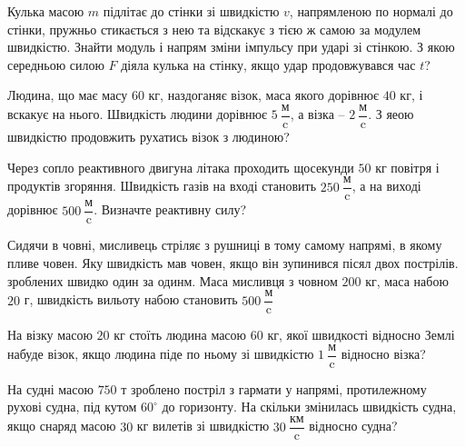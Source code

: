 \justifying

\begin{problem}{1}
	Кулька масою $m$ підлітає до стінки зі швидкістю $v$, напрямленою по нормалі до стінки, пружньо стикається з нею та відскакує з тією ж самою за модулем швидкістю. Знайти модуль і напрям зміни імпульсу при ударі зі стінкою. З якою середньою силою $F$ діяла кулька на стінку, якщо удар продовжувався час $t$?
\end{problem}







\begin{problem}{4}
	Людина, що має масу $60$ кг, наздоганяє візок, маса якого дорівнює $40$ кг, і вскакує на нього. Швидкість людини дорівнює $5~\dfrac{\text{м}}{\text{c}}$, а візка -- $2~\dfrac{\text{м}}{\text{c}}$. З яеою швидкістю продовжить рухатись візок з людиною?
\end{problem}

\begin{problem}{5}
	Через сопло реактивного двигуна літака проходить щосекунди $50$ кг повітря і продуктів згоряння. Швидкість газів на вході становить $250~\dfrac{\text{м}}{\text{c}}$, а на виході дорівнює $500~\dfrac{\text{м}}{\text{c}}$. Визначте реактивну силу?
\end{problem}



\begin{problem}{8}
	Сидячи в човні, мисливець стріляє з рушниці в тому самому напрямі, в якому пливе човен. Яку швидкість мав човен, якщо він зупинився пісял двох пострілів. зроблених швидко один за одинм. Маса мисливця з човном $200$ кг, маса набою $20$ г, швидкість вильоту набою становить $500~\dfrac{\text{м}}{\text{c}}$
\end{problem}

\begin{problem}{9}
	На візку масою $20$ кг стоїть людина масою $60$ кг, якої швидкості відносно Землі набуде візок, якщо людина піде по ньому зі швидкістю $1~\dfrac{\text{м}}{\text{c}} $ відносно візка?
\end{problem}

\begin{problem}{10}
	На судні масою $750$ т зроблено постріл з гармати у напрямі, протилежному рухові судна, під кутом $60^{\circ}$ до горизонту. На скільки змінилась швидкість судна, якщо снаряд масою $30$ кг вилетів зі швидкістю $30~\dfrac{\text{км}}{\text{c}}$ відносно судна?
\end{problem}





